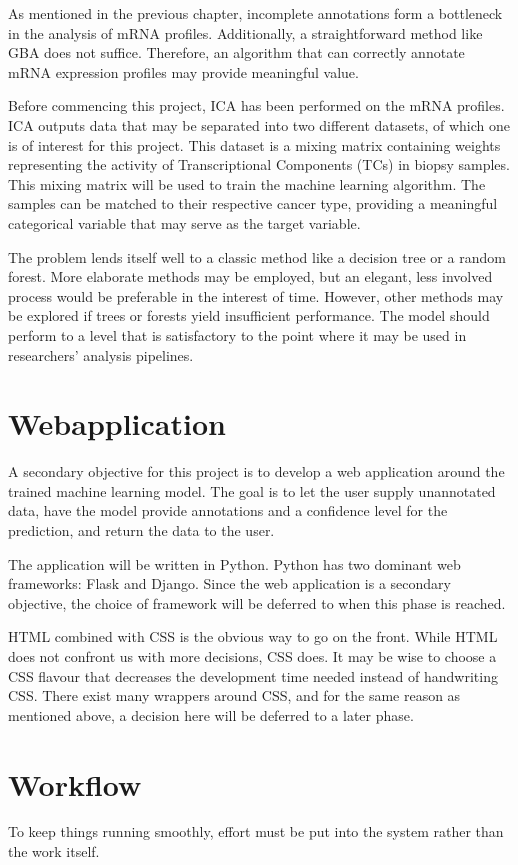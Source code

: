 As mentioned in the previous chapter, incomplete annotations form a bottleneck in the analysis of mRNA profiles.
Additionally, a straightforward method like GBA does not suffice.
Therefore, an algorithm that can correctly annotate mRNA expression profiles may provide meaningful value.

Before commencing this project, ICA has been performed on the mRNA profiles.
ICA outputs data that may be separated into two different datasets, of which one is of interest for this project.
This dataset is a mixing matrix containing weights representing the activity of Transcriptional Components (TCs) in biopsy samples.
This mixing matrix will be used to train the machine learning algorithm.
The samples can be matched to their respective cancer type, providing a meaningful categorical variable that may serve as the target variable.

The problem lends itself well to a classic method like a decision tree or a random forest.
More elaborate methods may be employed, but an elegant, less involved process would be preferable in the interest of time.
However, other methods may be explored if trees or forests yield insufficient performance.
The model should perform to a level that is satisfactory to the point where it may be used in researchers' analysis pipelines.

\section{Webapplication}
A secondary objective for this project is to develop a web application around the trained machine learning model.
The goal is to let the user supply unannotated data, have the model provide annotations and a confidence level for the prediction, and return the data to the user.

The application will be written in Python.
Python has two dominant web frameworks: Flask and Django.
Since the web application is a secondary objective, the choice of framework will be deferred to when this phase is reached.

HTML combined with CSS is the obvious way to go on the front.
While HTML does not confront us with more decisions, CSS does.
It may be wise to choose a CSS flavour that decreases the development time needed instead of handwriting CSS.
There exist many wrappers around CSS, and for the same reason as mentioned above, a decision here will be deferred to a later phase.

\section{Workflow}
To keep things running smoothly, effort must be put into the system rather than the work itself.

